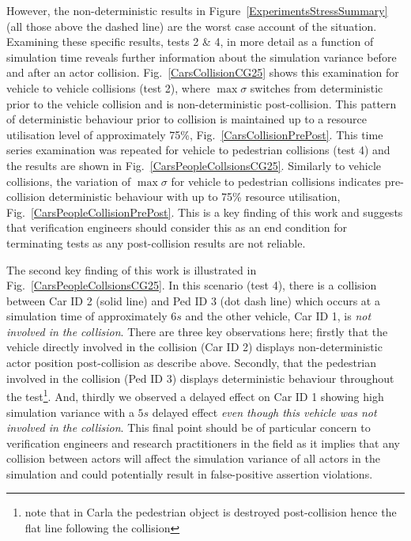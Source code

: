 \documentclass[letterpaper, 10 pt, journal, twoside]{IEEEtran}
\begin{document}
However, the non-deterministic results in Figure~\ref{ExperimentsStressSummary} (all those above the dashed line) are the worst case account of the situation. Examining these specific results, tests 2 \& 4, in more detail as a function of simulation time reveals further information about the simulation variance before and after an actor collision. Fig.~\ref{CarsCollisionCG25} shows this examination for vehicle to vehicle collisions (test 2), where $\max\sigma$ switches from deterministic prior to the vehicle collision and is non-deterministic post-collision. This pattern of deterministic behaviour prior to collision is maintained up to a resource utilisation level of approximately 75\%, Fig.~\ref{CarsCollisionPrePost}. This time series examination was repeated for vehicle to pedestrian collisions (test 4) and the results are shown in Fig.~\ref{CarsPeopleCollsionsCG25}. Similarly to vehicle collisions, the variation of $\max\sigma$ for vehicle to pedestrian collisions indicates pre-collision deterministic behaviour with up to 75\% resource utilisation, Fig.~\ref{CarsPeopleCollisionPrePost}. This is a key finding of this work and suggests that verification engineers should consider this as an end condition for terminating tests as any post-collision results are not reliable. 

The second key finding of this work is illustrated in Fig.~\ref{CarsPeopleCollsionsCG25}. In this scenario (test 4), there is a collision between Car ID 2 (solid line) and Ped ID 3 (dot dash line) which occurs at a simulation time of approximately $6s$ and the other vehicle, Car ID 1, is \textit{not involved in the collision}. There are three key observations here; firstly that the vehicle directly involved in the collision (Car ID 2) displays non-deterministic actor position post-collision as describe above. Secondly, that the pedestrian involved in the collision (Ped ID 3) displays deterministic behaviour throughout the test\footnote{note that in Carla the pedestrian object is destroyed post-collision hence the flat line following the collision}. And, thirdly we observed a delayed effect on Car ID 1 showing high simulation variance with a $5s$ delayed effect \textit{even though this vehicle was not involved in the collision}. This final point should be of particular concern to verification engineers and research practitioners in the field as it implies that any collision between actors will affect the simulation variance of all actors in the simulation and could potentially result in false-positive assertion violations.
\end{document}
